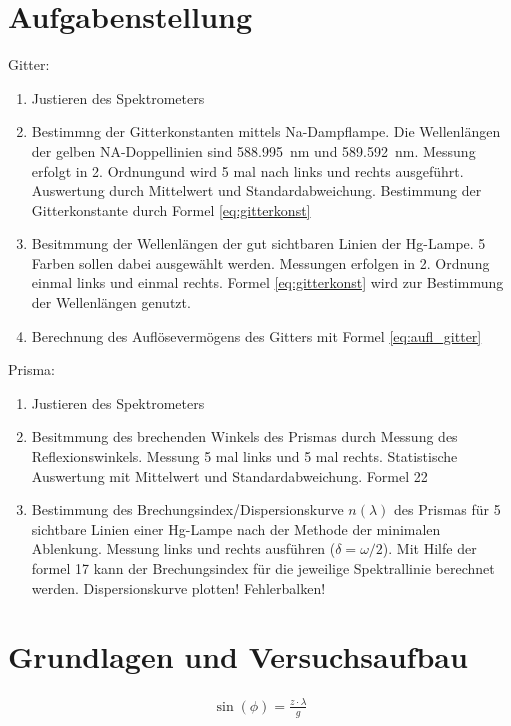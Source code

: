 \documentclass{article}
\begin{document}
\parindent0cm




\pagestyle{fancy}

\section{Aufgabenstellung}

Gitter:
\begin{enumerate}
\item Justieren des Spektrometers
\item Bestimmng der Gitterkonstanten mittels Na-Dampflampe. Die Wellenlängen der gelben NA-Doppellinien sind 588.995~nm und 589.592~nm. Messung erfolgt in 2. Ordnungund wird 5 mal nach links und rechts ausgeführt. Auswertung durch Mittelwert und Standardabweichung. Bestimmung der Gitterkonstante durch Formel \eqref{eq:gitterkonst}
\item Besitmmung der Wellenlängen der gut sichtbaren Linien der Hg-Lampe. 5 Farben sollen dabei ausgewählt werden. Messungen erfolgen in 2. Ordnung einmal links und einmal rechts. Formel \eqref{eq:gitterkonst} wird zur Bestimmung der Wellenlängen genutzt.
\item Berechnung des Auflösevermögens des Gitters mit Formel \eqref{eq:aufl_gitter}
\end{enumerate}


Prisma: 
\begin{enumerate}
\item Justieren des Spektrometers
\item Besitmmung des brechenden Winkels des Prismas durch Messung des Reflexionswinkels. Messung 5 mal links und 5 mal rechts. Statistische Auswertung mit Mittelwert und Standardabweichung. Formel 22
\item Bestimmung des Brechungsindex/Dispersionskurve $n(\lambda)$ des Prismas für 5 sichtbare Linien einer Hg-Lampe nach der Methode der minimalen Ablenkung. Messung links und rechts ausführen ($\delta = \omega/2$). Mit Hilfe der formel 17 kann der Brechungsindex für die jeweilige Spektrallinie berechnet werden. Dispersionskurve plotten! Fehlerbalken!
\end{enumerate}


\section{Grundlagen und Versuchsaufbau}

\begin{align}
\label{eq:gitterkonst}
\sin(\phi) = \frac{z\cdot \lambda}{g}
\end{align}
\end{document}
